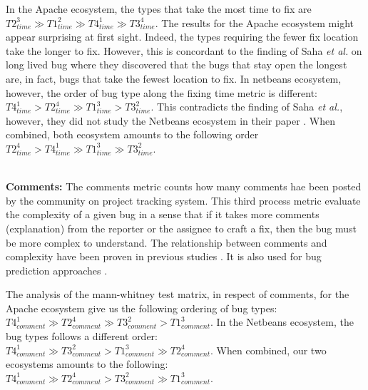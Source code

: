 In the Apache ecosystem, the types that take the most time to fix are  $T2_{time}^3
 \gg T1_{time}^2
 \gg T4_{time}^1
 \gg T3_{time}^4
$.
The results for the Apache ecosystem might appear surprising at first sight.
Indeed, the types requiring the fewer fix location take the longer to fix.
However, this is concordant to the finding of Saha {\it et al.} on long lived bug \cite{Saha2014} where they discovered that the bugs that stay open the longest are, in fact, bugs that take the fewest location to fix.
In netbeans ecosystem, however, the order of bug type along the fixing time metric is different: $T4_{time}^1
 > T2_{time}^4
 \gg T1_{time}^3
 > T3_{time}^2
$.
This contradicts the finding of Saha {\it et al.}, however, they did not study the Netbeans ecosystem in their paper \cite{Saha2014}.
When combined, both ecosystem amounts to the following order
$
T2_{time}^4
 >
T4_{time}^1
 \gg
T1_{time}^3
 \gg
T3_{time}^2
$.

\\ \vspace{0.1cm} {\bf Comments: }
The comments metric counts how many comments hae been posted by the community on project tracking system.
This third process metric evaluate the complexity of a given bug in a sense that if it takes more comments (explanation) from the reporter or the assignee to craft a fix, then the bug must be more complex to understand.
The relationship between comments and complexity have been proven in previous studies \cite{Zhang2013,Zhang2012}.
It is also used for bug prediction approaches \cite{DAmbros2010,Bhattacharya2011}.

The analysis of the mann-whitney test matrix, in respect of comments, for the Apache ecosystem give us the following ordering of bug types:
$
T4_{comment}^1
 \gg
T2_{comment}^4
 \gg
T3_{comment}^2
 >
T1_{comment}^3
$.
In the Netbeans ecosystem, the bug types follows a different order:
$
T4_{comment}^1
 \gg
T3_{comment}^2
 >
T1_{comment}^3
 \gg
T2_{comment}^4
$.
When combined, our two ecosystems amounts to the following:
$
T4_{comment}^1
 \gg
T2_{comment}^4
 >
T3_{comment}^2
 \gg
T1_{comment}^3
$.

